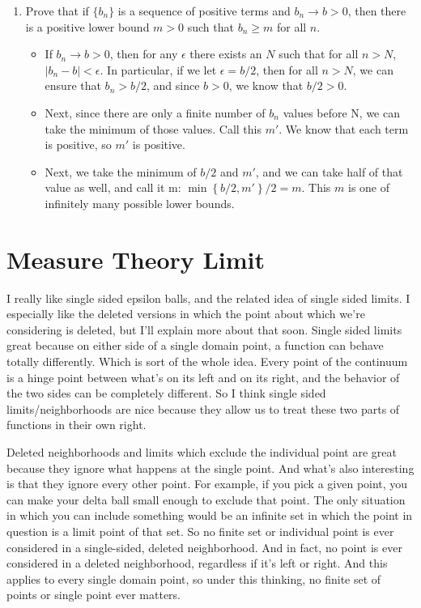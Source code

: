 \documentclass{article}
\begin{document}
\begin{enumerate}
\begin{enumerate}
        
    \end{enumerate}
                \newpage
            \item Prove that if $\{b_n\}$ is a sequence of positive terms and $b_n \rightarrow b > 0$, then there is a positive lower bound $m > 0$ such that $b_n \geq m$ for all $n$.
\begin{itemize}
    \item If $b_n \rightarrow b > 0$, then for any $\epsilon$ there exists an $N$ such that for all $n > N$, $|b_n - b| < \epsilon$. In particular, if we let $\epsilon = b/2$, then for all $n > N$, we can ensure that $b_n > b/2$, and since $b > 0$, we know that $b/2 > 0$. 
    \item Next, since there are only a finite number of $b_n$ values before N, we can take the minimum of those values. Call this $m'$.  We know that each term is positive, so $m'$ is positive.
    \item Next, we take the minimum of $b/2$ and $m'$, and we can take half of that value as well, and call it m: $\min  \left\{b/2,m'\right\}/2 = m$. This $m$ is one of infinitely many possible lower bounds.
\end{itemize}
\end{enumerate}



\section{Measure Theory Limit}

I really like single sided epsilon balls, and the related idea of single sided limits.  I especially like the deleted versions in which the point about which we're considering is deleted, but I'll explain more about that soon.  Single sided limits great because on either side of a single domain point, a function can behave totally differently. Which is sort of the whole idea. Every point of the continuum is a hinge point between what's on its left and on its right, and the behavior of the two sides can be completely different. So I think single sided limits/neighborhoods are nice because they allow us to treat these two parts of functions in their own right.

Deleted neighborhoods and limits which exclude the individual point are great because they ignore what happens at the single point. And what's also interesting is that they ignore every other point. For example, if you pick a given point, you can make your delta ball small enough to exclude that point. The only situation in which you can include something would be an infinite set in which the point in question is a limit point of that set. So no finite set or individual point is ever considered in a single-sided, deleted neighborhood. And in fact, no point is ever considered in a deleted neighborhood, regardless if it's left or right. And this applies to every single domain point, so under this thinking, no finite set of points or single point ever matters. 
\end{document}
